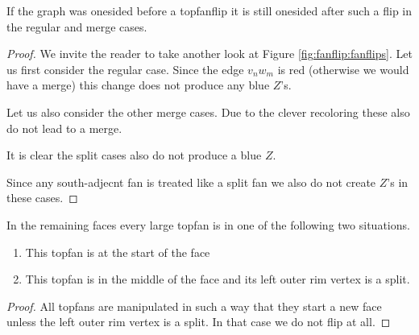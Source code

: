 \begin{lemma}
  \label{lm:topfan:oneSidedREL}
  If the graph was onesided before a topfanflip it is still onesided after such a flip in the regular and merge cases.
\end{lemma}
\begin{proof}
  We invite the reader to take another look at Figure \ref{fig:fanflip:fanflips}.
  Let us first consider the regular case. Since the edge  $v_n w_m$ is red (otherwise we would have a merge) this change does not produce any blue $Z$'s.

  Let us also consider the other merge cases. Due to the clever recoloring these also do not lead to a merge.

  It is clear the split cases also do not produce a blue $Z$.

  Since any south-adjecnt fan is treated like a split fan we also do not create $Z$'s  in these cases.
\end{proof}


\begin{lemma}
  \label{lm:topfan:remainingTopfans}
  In the remaining faces every large topfan is in one of the following two situations.
  \begin{enumerate}
    \item  This topfan is at the start of the face
    \item  This topfan is in the middle of the face and its left outer rim vertex is a split.
  \end{enumerate}
\end{lemma}
\begin{proof}
  All topfans are manipulated in such a way that they start a new face unless the left outer rim vertex is a split. In that case we do not flip at all.
\end{proof}
